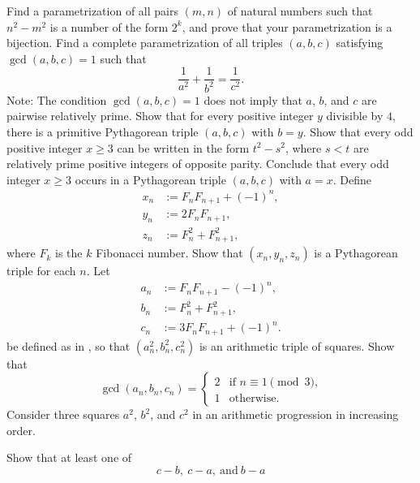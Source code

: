 \begin{challenge}
  \exercise Find a parametrization of all pairs $(m,n)$ of natural numbers such that $n^2-m^2$ is a number of the form $2^k$, and prove that your parametrization is a bijection.
  \exercise Find a complete parametrization of all triples $(a,b,c)$ satisfying $\gcd(a,b,c)=1$ such that
    \begin{equation*}
      \frac{1}{a^2}+\frac{1}{b^2}=\frac{1}{c^2}.
    \end{equation*}
    Note: The condition $\gcd(a,b,c)=1$ does not imply that $a$, $b$, and $c$ are pairwise relatively prime.
  \exercise Show that for every positive integer $y$ divisible by $4$, there is a primitive Pythagorean triple $(a,b,c)$ with $b=y$.
  \exercise Show that every odd positive integer $x\geq 3$ can be written in the form $t^2-s^2$, where $s<t$ are relatively prime positive integers of opposite parity. Conclude that every odd integer $x\geq 3$ occurs in a Pythagorean triple $(a,b,c)$ with $a=x$.
  \exercise Define
  \begin{align*}
    x_n & := F_n F_{n+1}+(-1)^n, \\
    y_n & := 2F_nF_{n+1}, \\
    z_n & := F_{n}^2+F_{n+1}^2,
  \end{align*}
  where $F_k$ is the $k$\supth{} Fibonacci number. Show that $(x_n,y_n,z_n)$ is a Pythagorean triple for each $n$.
  \exercise Let
  \begin{align*}
    a_n & := F_{n}F_{n+1}- (-1)^n, \\
    b_n & := F_{n}^2 + F_{n+1}^2, \\
    c_n & := 3F_{n}F_{n+1}+(-1)^{n}.
  \end{align*}
  be defined as in , so that $(a_n^2,b_n^2,c_n^2)$ is an arithmetic triple of squares. Show that
  \begin{equation*}
    \gcd(a_n,b_n,c_n)=
    \begin{cases}
      2 & \text{if $n\equiv 1\pmod{3}$,}\\
      1 & \text{otherwise.}
    \end{cases}
  \end{equation*}
    \exercise Consider three squares $a^2$, $b^2$, and $c^2$ in an arithmetic progression in increasing order.
  \begin{subexenum}
  \item Show that at least one of
    \begin{equation*}
      c-b,~c-a,~\text{and}~b-a

\end{equation*}
\end{subexenum}
\end{challenge}
